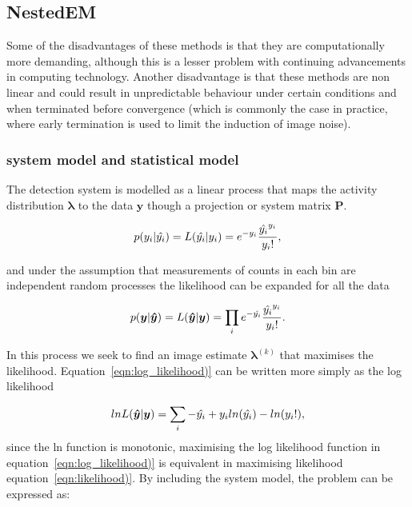 \subsection{NestedEM}






\noindent\makebox[\linewidth]{\rule{\paperwidth}{0.4pt}}


Some of the disadvantages of these methods is that they are computationally more demanding, although this is a lesser problem with continuing advancements in computing technology. Another disadvantage is that these methods are non linear and could result in unpredictable behaviour under certain conditions and when terminated before convergence (which is commonly the case in practice, where early termination is used to limit the induction of image noise). 

\subsubsection{system model and statistical model}
The detection system is modelled as a linear process that maps the activity distribution $\bm\lambda$ to the data $\bm{y}$ though a projection or system matrix $\bm{P}$. 


\begin{equation}
p({y_i}|{\hat{y_i}}) = L({\hat{y_i}}|{y_i}) = e^{-{y_i}} \frac{\hat{y_i}^{y_i}}{{y_i}!}  \\ \\  , 
\label{eqn:bin_likelihood)}
\end{equation}

and under the assumption that measurements of counts in each bin are independent random processes the likelihood can be expanded for all the data

\begin{equation}
p(\bm{y}|\bm{\hat{y}}) = L(\bm{\hat{y}}|\bm{y}) = \prod_i e^{-\hat{y_i}} \frac{\hat{y_i}^{y_i}}{{y_i}!} \\ \\ .
\label{eqn:likelihood)}
\end{equation}

In this process we seek to find an image estimate  $\bm\lambda^{(k)}$ that maximises the likelihood. Equation~\ref{eqn:log_likelihood)} can be written more simply as the log likelihood

\begin{equation}
    lnL(\bm{\hat{y}}|\bm{y})  = \sum_i  -\hat{y_i} + y_i ln(\hat{y_i}) - ln({y_i}!)  \\ ,
    \label{eqn:log_likelihood)}
\end{equation}since the ln function is monotonic, maximising the log likelihood function in equation~\ref{eqn:log_likelihood)} is equivalent in maximising likelihood equation~\ref{eqn:likelihood)}. By including the system model, the problem can be expressed as: 

